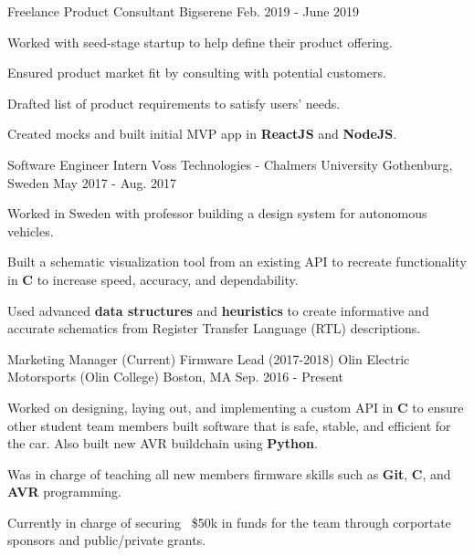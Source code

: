 \begin{cventries}
  \cventry
    {Freelance Product Consultant} %
    {Bigserene} %
    {} %
    {Feb. 2019 - June 2019} %
    {
      \begin{cvitems} %
        \item Worked with seed-stage startup to help define their product offering.
        \item Ensured product market fit by consulting with potential customers.
        \item Drafted list of product requirements to satisfy users' needs.
        \item Created mocks and built initial MVP app in \textbf{ReactJS} and \textbf{NodeJS}.
      \end{cvitems}
  }

  \cventry
    {Software Engineer Intern} %
    {Voss Technologies - Chalmers University} %
    {Gothenburg, Sweden} %
    {May 2017 - Aug. 2017} %
    {
      \begin{cvitems} %
        \item Worked in Sweden with professor building a design system for autonomous vehicles.
        \item Built a schematic visualization tool from an existing API to recreate functionality in \textbf{C} to increase speed, accuracy, and dependability. 
        \item Used advanced \textbf{data structures} and \textbf{heuristics} to create informative and accurate schematics from Register Transfer Language (RTL) descriptions.
      \end{cvitems}
    }

  \cventry
    {Marketing Manager (Current) Firmware Lead (2017-2018)} %
    {Olin Electric Motorsports (Olin College)} %
    {Boston, MA} %
    {Sep. 2016 - Present} %
    {
      \begin{cvitems} %
        \item Worked on designing, laying out, and implementing a custom API in \textbf{C} to ensure other student team members built software that is safe, stable, and efficient for the car. Also built new AVR buildchain using \textbf{Python}.
        \item Was in charge of teaching all new members firmware skills such as \textbf{Git}, \textbf{C}, and \textbf{AVR} programming.
        \item Currently in charge of securing ~\$50k in funds for the team through corportate sponsors and public/private grants.
      \end{cvitems}
    }

\end{cventries}
